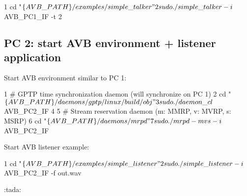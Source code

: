 \begin{DoxyCode}
1 cd "$\{AVB\_PATH\}/examples/simple\_talker"
2 sudo ./simple\_talker -i $AVB\_PC1\_IF -t 2
\end{DoxyCode}


\subsection*{PC 2\+: start A\+VB environment + listener application}

Start A\+VB environment similar to PC 1\+:


\begin{DoxyCode}
1 # GPTP time synchronization daemon (will synchronize on PC 1)
2 cd "$\{AVB\_PATH\}/daemons/gptp/linux/build/obj"
3 sudo ./daemon\_cl $AVB\_PC2\_IF
4 
5 # Stream reservation daemon (m: MMRP, v: MVRP, s: MSRP)
6 cd "$\{AVB\_PATH\}/daemons/mrpd"
7 sudo ./mrpd -mvs -i $AVB\_PC2\_IF
\end{DoxyCode}


Start A\+VB listener example\+:


\begin{DoxyCode}
1 cd "$\{AVB\_PATH\}/examples/simple\_listener"
2 sudo ./simple\_listener -i $AVB\_PC2\_IF -f out.wav
\end{DoxyCode}


\+:tada\+: 